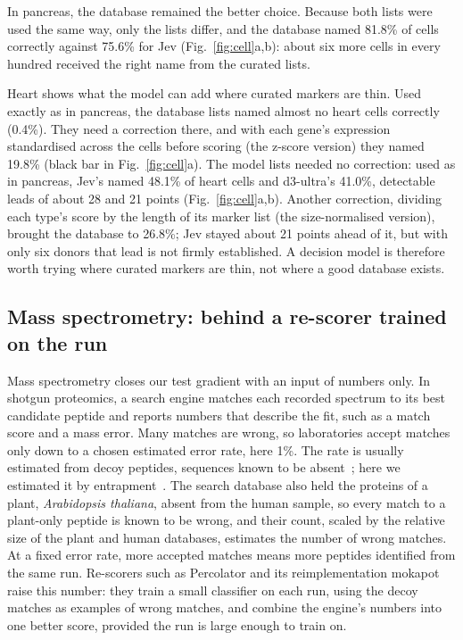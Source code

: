 \documentclass[10pt,twocolumn]{article}
\begin{document}
In pancreas, the database remained the better choice. Because both lists were used the same way, only the lists differ, and the database named 81.8\% of cells correctly against 75.6\% for Jev (Fig.~\ref{fig:cell}a,b): about six more cells in every hundred received the right name from the curated lists.

Heart shows what the model can add where curated markers are thin. Used exactly as in pancreas, the database lists named almost no heart cells correctly (0.4\%). They need a correction there, and with each gene's expression standardised across the cells before scoring (the z-score version) they named 19.8\% (black bar in Fig.~\ref{fig:cell}a). The model lists needed no correction: used as in pancreas, Jev's named 48.1\% of heart cells and d3-ultra's 41.0\%, detectable leads of about 28 and 21 points (Fig.~\ref{fig:cell}a,b). Another correction, dividing each type's score by the length of its marker list (the size-normalised version), brought the database to 26.8\%; Jev stayed about 21 points ahead of it, but with only six donors that lead is not firmly established. A decision model is therefore worth trying where curated markers are thin, not where a good database exists.
\enlargethispage{\baselineskip}%

\subsection{Mass spectrometry: behind a re-scorer trained on the run}

Mass spectrometry closes our test gradient with an input of numbers only. In shotgun proteomics, a search engine matches each recorded spectrum to its best candidate peptide and reports numbers that describe the fit, such as a match score and a mass error. Many matches are wrong, so laboratories accept matches only down to a chosen estimated error rate, here 1\%. The rate is usually estimated from decoy peptides, sequences known to be absent~\cite{elias}; here we estimated it by entrapment~\cite{wen}. The search database also held the proteins of a plant, \emph{Arabidopsis thaliana}, absent from the human sample, so every match to a plant-only peptide is known to be wrong, and their count, scaled by the relative size of the plant and human databases, estimates the number of wrong matches. At a fixed error rate, more accepted matches means more peptides identified from the same run. Re-scorers such as Percolator and its reimplementation mokapot~\cite{kall,mokapot} raise this number: they train a small classifier on each run, using the decoy matches as examples of wrong matches, and combine the engine's numbers into one better score, provided the run is large enough to train on.
\end{document}
